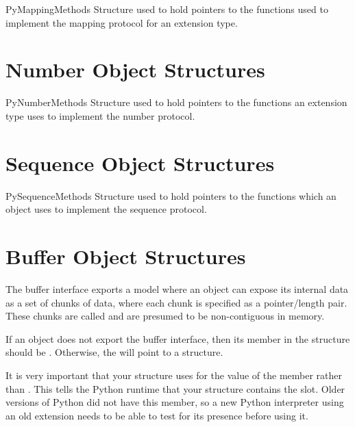 \documentclass{manual}
\begin{document}
\begin{ctypedesc}{PyMappingMethods}
Structure used to hold pointers to the functions used to implement the 
mapping protocol for an extension type.
\end{ctypedesc}


\section{Number Object Structures \label{number-structs}}

\begin{ctypedesc}{PyNumberMethods}
Structure used to hold pointers to the functions an extension type
uses to implement the number protocol.
\end{ctypedesc}


\section{Sequence Object Structures \label{sequence-structs}}

\begin{ctypedesc}{PySequenceMethods}
Structure used to hold pointers to the functions which an object uses
to implement the sequence protocol.
\end{ctypedesc}


\section{Buffer Object Structures \label{buffer-structs}}

The buffer interface exports a model where an object can expose its
internal data as a set of chunks of data, where each chunk is
specified as a pointer/length pair.  These chunks are called
 and are presumed to be non-contiguous in memory.

If an object does not export the buffer interface, then its
 member in the  structure
should be \NULL{}.  Otherwise, the  will point to
a  structure.

 It is very important that your
 structure uses  for
the value of the  member rather than .  This
tells the Python runtime that your  structure
contains the  slot. Older versions of Python
did not have this member, so a new Python interpreter using an old
extension needs to be able to test for its presence before using it.
\end{document}
